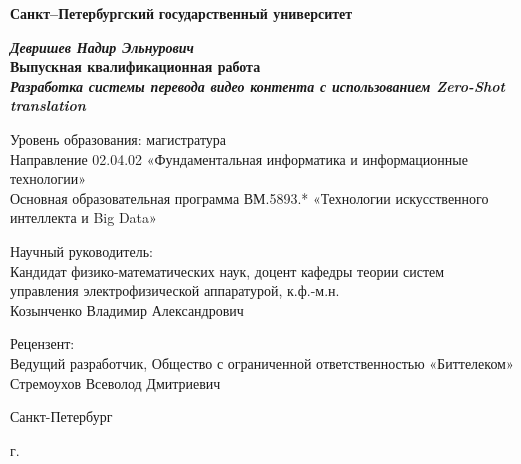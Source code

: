 
\begin{titlepage}
\begin{center}

\textbf{Санкт--Петербургский}
\textbf{государственный университет}

\vspace{20mm}

\textbf{\textit{\large Девришев Надир Эльнурович}} \\[8mm]
\textbf{\large Выпускная квалификационная работа}\\[3mm]
\textbf{\textit{\large Разработка системы перевода видео контента с использованием Zero-Shot translation}}

\vspace{15mm}
Уровень образования: магистратура\\
Направление 02.04.02 «Фундаментальная информатика и информационные технологии»\\
Основная образовательная программа ВМ.5893.*
«Технологии искусственного интеллекта и Big Data»\\[25mm]


\begin{flushright}
\begin{minipage}[t]{0.65\textwidth}
{Научный руководитель:} \\
Кандидат физико-математических наук, доцент кафедры теории систем управления электрофизической аппаратурой, к.ф.-м.н. \\
Козынченко Владимир Александрович

\vspace{2mm}

{Рецензент:} \\
Ведущий разработчик, Общество с ограниченной ответственностью «Биттелеком» \\
Стремоухов Всеволод Дмитриевич
\end{minipage}
\end{flushright}

\vfill 

{Санкт-Петербург}
\par{\the\year{} г.}
\end{center}
\end{titlepage}
\restoregeometry
\addtocounter{page}{1}
